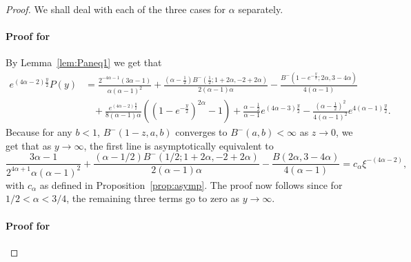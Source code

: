 \begin{proof}
We shall deal with each of the three cases for $\alpha$ separately.

\paragraph{Proof for }
By Lemma~\ref{lem:Paneq1} we get that
\begin{align*}
	e^{(4\alpha - 2)\frac{y}{2}}P(y) &= \frac{2^{-4 \alpha-1} (3 \alpha - 1)}{\alpha (\alpha - 1)^2} 
		+ \frac{(\alpha - \frac{1}{2} ) B^-(\frac{1}{2}; 1 + 2 \alpha, -2 + 2 \alpha)}{2(\alpha - 1) \alpha}
		- \frac{B^-(1-e^{-\frac{y}{2}}; 2\alpha, 3-4\alpha)}{4(\alpha - 1)} \\
	&\hspace{10pt}+ \frac{e^{(4\alpha - 2)\frac{y}{2}}}{8(\alpha-1)\alpha}\left((1 - e^{-\frac{y}{2}})^{2\alpha} - 1\right)
		+ \frac{\alpha-\frac{1}{2}}{\alpha-1} e^{(4\alpha-3)\frac{y}{2}}
		- \frac{(\alpha - \frac{1}{2})^2}{4(\alpha-1)^2} e^{4(\alpha-1)\frac{y}{2}}.
\end{align*}
Because for any $b < 1$, $B^-(1-z,a,b)$ converges to $B^-(a,b) < \infty$ as $z \to 0$, we get that as $y \to \infty$, the first line is asymptotically equivalent to
\[
	\frac{3 \alpha - 1}{2^{4 \alpha+1} \alpha (\alpha - 1)^2} 
			+ \frac{(\alpha - 1/2 ) B^-(1/2; 1 + 2 \alpha, -2 + 2 \alpha)}{2(\alpha - 1) \alpha}
			- \frac{B(2\alpha, 3-4\alpha)}{4(\alpha - 1)} = c_\alpha \xi^{-(4\alpha - 2)},
\]
with $c_\alpha$ as defined in Proposition~\eqref{prop:asymp}. The proof now follows since for $1/2 < \alpha < 3/4$, the remaining three terms go to zero as $y \to \infty$.

\paragraph{Proof for }


\end{proof}
